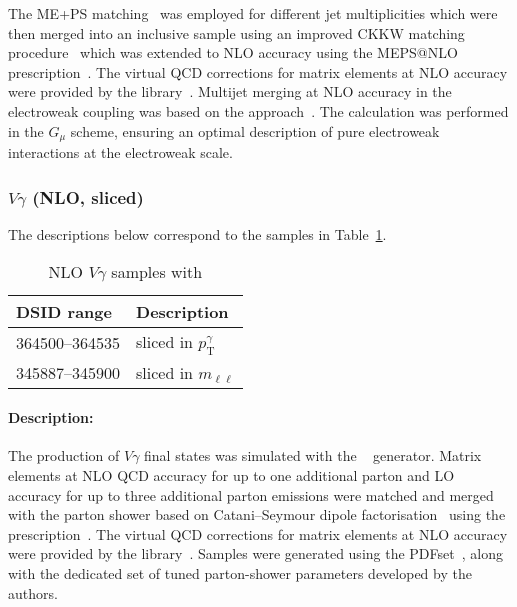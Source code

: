 The ME+PS matching~\cite{Hoeche:2011fd} was employed for different jet
multiplicities which were then merged into an inclusive sample 
using an improved CKKW matching
procedure~\cite{Catani:2001cc,Hoeche:2009rj} which was extended to NLO
accuracy using the MEPS@NLO prescription~\cite{Hoeche:2012yf}. 
The virtual QCD corrections for matrix elements at NLO accuracy were provided by 
the \OPENLOOPS[2] library~\cite{Buccioni:2019sur,Cascioli:2011va,Buccioni:2017yxi,Denner:2016kdg}.
Multijet merging at NLO accuracy in the electroweak coupling was based on 
the \NLOEWvirt approach~\cite{Kallweit:2014xda,Kallweit:2015dum}.
The calculation was performed in the $G_\mu$ scheme, ensuring an optimal 
description of pure electroweak interactions at the electroweak scale.







\subsubsection[Vgamma (NLO, sliced)]{$V\gamma$ (NLO, sliced)}

The descriptions below correspond to the samples in
Table~\ref{tab:MB-sherpa-vynlo}.

\begin{table}[htbp]
  \begin{center}
    \caption{NLO $V\gamma$ samples with \SHERPA}
    \label{tab:MB-sherpa-vynlo}
    \begin{tabular}{ l | l }
      \hline
      DSID range & Description \\
      \hline
      364500--364535   & sliced in $p_{\text{T}}^{\gamma}$\\ 
      345887--345900   & sliced in $m_{\ell\ell}$\\
      \hline
    \end{tabular}
  \end{center}
\end{table}

\paragraph{Description:}

The production of $V\gamma$ final states was simulated with the
\SHERPA[2.2.2]~\cite{Bothmann:2019yzt} generator.  Matrix elements at
NLO QCD accuracy for up to one additional parton and LO accuracy for
up to three additional parton emissions were matched and merged with
the \SHERPA parton shower based on Catani--Seymour
dipole factorisation~\cite{Gleisberg:2008fv,Schumann:2007mg} using the \MEPSatNLO
prescription~\cite{Hoeche:2011fd,Hoeche:2012yf,Catani:2001cc,Hoeche:2009rj}.
The virtual QCD corrections for matrix elements at NLO accuracy were
provided by the
\OPENLOOPS library~\cite{Buccioni:2019sur,Cascioli:2011va,Denner:2016kdg}. Samples
were generated using the \NNPDF[3.0nnlo] PDFset~\cite{Ball:2014uwa}, along with
the dedicated set of tuned parton-shower parameters developed by the
\SHERPA authors.



